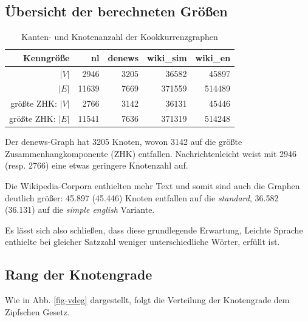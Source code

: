 \documentclass[11pt, a4paper]{article}
\begin{document}
\subsection{Übersicht der berechneten Größen}
\begin{table}[ht]
    \begin{tabular}{*{5}{r}}
    \toprule
    Kenngröße                     & nl        & denews    & wiki\_sim & wiki\_en \\
    \midrule
    $|V|$                         & 2946      & 3205      & 36582     & 45897  \\
    $|E|$                         & 11639     & 7669      & 371559    & 514489 \\
    größte ZHK: $|V|$             & 2766      & 3142      & 36131     & 45446  \\
    größte ZHK: $|E|$             & 11541     & 7636      & 371319    & 514248 \\
    \bottomrule
    \end{tabular}
    \caption{Kanten- und Knotenanzahl der Kookkurrenzgraphen}
    \label{tab-zsf}
\end{table}

Der denews-Graph hat 3205 Knoten, wovon 3142 auf die größte
Zusammenhangkomponente (ZHK) entfallen.
Nachrichtenleicht weist mit 2946 (resp. 2766) eine etwas geringere
Knotenzahl auf.

Die Wikipedia-Corpora enthielten mehr Text und somit sind auch die Graphen
deutlich größer: 45.897 (45.446) Knoten entfallen auf die \emph{standard},
36.582 (36.131) auf die \emph{simple english} Variante.

Es l\"asst sich also schlie\ss{}en, dass diese grundlegende Erwartung,
Leichte Sprache enthielte bei gleicher Satzzahl weniger unterschiedliche Wörter,
erf\"ullt ist.


\subsection{Rang der Knotengrade}

Wie in Abb. \ref{fig-vdeg} dargestellt, folgt die Verteilung der Knotengrade
dem Zipfschen Gesetz.
\end{document}
